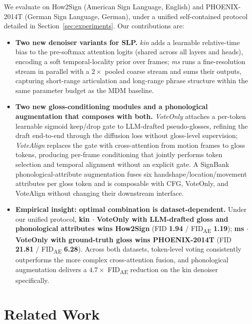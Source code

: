 \documentclass{article}
\begin{document}
We evaluate on How2Sign (American Sign Language, English) and PHOENIX-2014T (German Sign Language, German), under a unified self-contained protocol detailed in Section~\ref{sec:experiments}.
Our contributions are:
\begin{itemize}
    \item \textbf{Two new denoiser variants for SLP.} \emph{kin} adds a learnable relative-time bias to the pre-softmax attention logits (shared across all layers and heads), encoding a soft temporal-locality prior over frames; \emph{ms} runs a fine-resolution stream in parallel with a $2{\times}$ pooled coarse stream and sums their outputs, capturing short-range articulation and long-range phrase structure within the same parameter budget as the MDM baseline.
    \item \textbf{Two new gloss-conditioning modules and a phonological augmentation that composes with both.} \emph{VoteOnly} attaches a per-token learnable sigmoid keep/drop gate to LLM-drafted pseudo-glosses, refining the draft end-to-end through the diffusion loss without gloss-level supervision; \emph{VoteAlign} replaces the gate with cross-attention from motion frames to gloss tokens, producing per-frame conditioning that jointly performs token selection and temporal alignment without an explicit gate. A SignBank phonological-attribute augmentation fuses six handshape/location/movement attributes per gloss token and is composable with CFG, VoteOnly, and VoteAlign without changing their downstream interface.
    \item \textbf{Empirical insight: optimal combination is dataset-dependent.} Under our unified protocol, \textbf{kin $\cdot$ VoteOnly with LLM-drafted gloss and phonological attributes wins How2Sign} (FID \textbf{1.94} / FID\textsubscript{AE} \textbf{1.19}); \textbf{ms $\cdot$ VoteOnly with ground-truth gloss wins PHOENIX-2014T} (FID \textbf{21.81} / FID\textsubscript{AE} \textbf{6.28}). Across both datasets, token-level voting consistently outperforms the more complex cross-attention fusion, and phonological augmentation delivers a $4.7{\times}$ FID\textsubscript{AE} reduction on the kin denoiser specifically.
\end{itemize}

\section{Related Work}
\label{sec:related}
\end{document}
